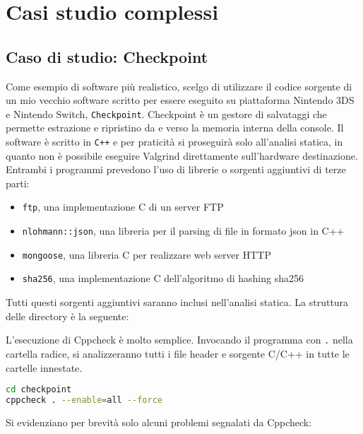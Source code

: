 \documentclass{article}
\begin{document}
\newpage
\section{Casi studio complessi}

\subsection{Caso di studio: Checkpoint}
\label{sec:checkpoint}

Come esempio di software più realistico, scelgo di utilizzare il codice sorgente
di un mio vecchio software scritto per essere eseguito su piattaforma Nintendo
3DS e Nintendo Switch, \texttt{Checkpoint}. Checkpoint è un gestore di
salvataggi che permette estrazione e ripristino da e verso la memoria interna
della console. Il software è scritto in \texttt{C++} e per praticità si
proseguirà solo all'analisi statica, in quanto non è possibile eseguire Valgrind
direttamente sull'hardware destinazione. \\

Entrambi i programmi prevedono l'uso di librerie o sorgenti aggiuntivi di terze parti:

\begin{itemize}
    \item \texttt{ftp}, una implementazione C di un server FTP
    \item \texttt{nlohmann::json}, una libreria per il parsing di file in
    formato json in C++
    \item \texttt{mongoose}, una libreria C per realizzare web server HTTP
    \item \texttt{sha256}, una implementazione C dell'algoritmo di hashing sha256
\end{itemize}

Tutti questi sorgenti aggiuntivi saranno inclusi nell'analisi statica. La
struttura delle directory è la seguente:


L'esecuzione di Cppcheck è molto semplice. Invocando il programma con \texttt{.}
nella cartella radice, si analizzeranno tutti i file header e sorgente C/C++
in tutte le cartelle innestate.

\begin{lstlisting}[language=bash]
cd checkpoint
cppcheck . --enable=all --force
\end{lstlisting}

Si evidenziano per brevità solo alcuni problemi segnalati da Cppcheck:
\end{document}
